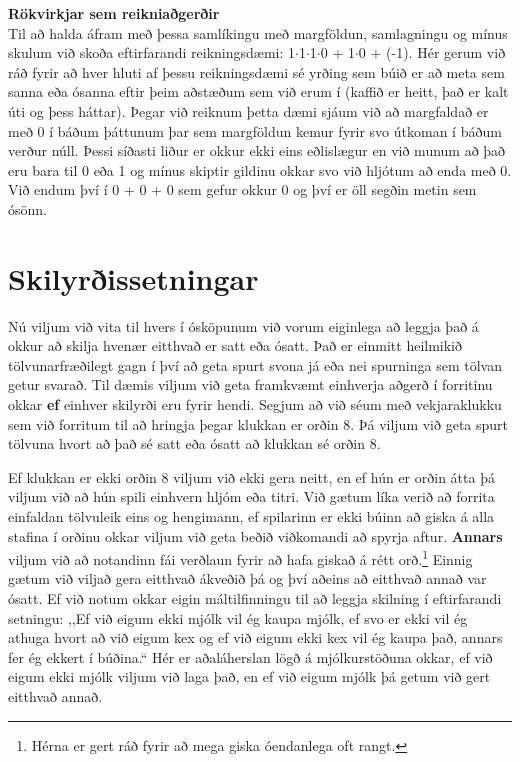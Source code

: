\vspace{5pt}
\begin{itarefni}
\textbf{Rökvirkjar sem reikniaðgerðir}\\
Til að halda áfram með þessa samlíkingu með margföldun, samlagningu og mínus skulum við skoða eftirfarandi reikningsdæmi:
1$\cdot$1$\cdot$1$\cdot$0 + 1$\cdot$0 + (-1).
Hér gerum við ráð fyrir að hver hluti af þessu reikningsdæmi sé yrðing sem búið er að meta sem sanna eða ósanna eftir þeim aðstæðum sem við erum í (kaffið er heitt, það er kalt úti og þess háttar).
Þegar við reiknum þetta dæmi sjáum við að margfaldað er með 0 í báðum þáttunum þar sem margföldun kemur fyrir svo útkoman í báðum verður núll.
Þessi síðasti liður er okkur ekki eins eðlislægur en við munum að það eru bara til 0 eða 1 og mínus skiptir gildinu okkar svo við hljótum að enda með 0.
Við endum því í 0 + 0 + 0 sem gefur okkur 0 og því er öll segðin metin sem ósönn.
\end{itarefni}


\section{Skilyrðissetningar}
Nú viljum við vita til hvers í ósköpunum við vorum eiginlega að leggja það á okkur að skilja hvenær eitthvað er satt eða ósatt.
Það er einmitt heilmikið tölvunarfræðilegt gagn í því að geta spurt svona já eða nei spurninga sem tölvan getur svarað.
Til dæmis viljum við geta framkvæmt einhverja aðgerð í forritinu okkar \textbf{ef} einhver skilyrði eru fyrir hendi.
Segjum að við séum með vekjaraklukku sem við forritum til að hringja þegar klukkan er orðin 8.
Þá viljum við geta spurt tölvuna hvort að það sé satt eða ósatt að klukkan sé orðin 8.

Ef klukkan er ekki orðin 8 viljum við ekki gera neitt, en ef hún er orðin átta þá viljum við að hún spili einhvern hljóm eða titri.
Við gætum líka verið að forrita einfaldan tölvuleik eins og hengimann, ef spilarinn er ekki búinn að giska á alla stafina í orðinu okkar viljum við geta beðið viðkomandi að spyrja aftur.
\textbf{Annars} viljum við að notandinn fái verðlaun fyrir að hafa giskað á rétt orð.\footnote{Hérna er gert ráð fyrir að mega giska óendanlega oft rangt.}
Einnig gætum við viljað gera eitthvað ákveðið þá og því aðeins að eitthvað annað var ósatt.
Ef við notum okkar eigin máltilfinningu til að leggja skilning í eftirfarandi setningu: ,,Ef við eigum ekki mjólk vil ég kaupa mjólk, ef svo er ekki vil ég athuga hvort að við eigum kex og ef við eigum ekki kex vil ég kaupa það, annars fer ég ekkert í búðina.“
Hér er aðaláherslan lögð á mjólkurstöðuna okkar, ef við eigum ekki mjólk viljum við laga það, en ef við eigum mjólk þá getum við gert eitthvað annað.

